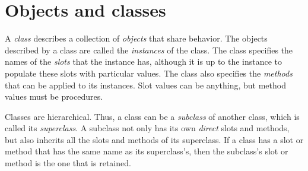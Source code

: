 \chapter{Objects and classes}

A {\em class} describes a collection of {\em objects}
that share behavior.  The objects described by a class
are called the {\em instances} of the class.  The class
specifies the names of the {\em slots} that the
instance has, although it is up to the instance to
populate these slots with particular values.
The class also specifies the {\em methods} that can be
applied to its instances.  Slot values can be anything,
but method values must be procedures.  


Classes are hierarchical.  Thus, a class can be a {\em
subclass} of another class, which is called its {\em
superclass}.  A subclass not only has its own {\em
direct} slots and methods, but also inherits all the
slots and methods of its superclass.  If a class has a
slot or method that has the same name as its
superclass’s, then the subclass’s slot or method is the
one that is retained.






